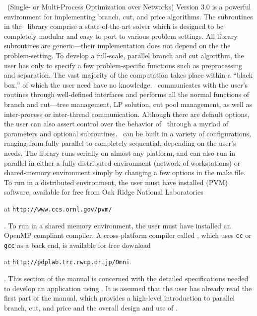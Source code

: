 \BB\ (Single- or Multi-Process Optimization over Networks) Version 3.0
is a powerful environment for implementing branch, cut, and price
algorithms. The subroutines in the \BB\ library comprise a
state-of-the-art solver which is designed to be completely modular and
easy to port to various problem settings. All library subroutines are
generic---their implementation does not depend on the the
problem-setting. To develop a full-scale, parallel branch and cut
algorithm, the user has only to specify a few problem-specific
functions such as preprocessing and separation. The vast majority of
the computation takes place within a ``black box,'' of which the user
need have no knowledge. \BB\ communicates with the user's routines
through well-defined interfaces and performs all the normal functions
of branch and cut---tree management, LP solution, cut pool management,
as well as inter-process or inter-thread communication. Although there
are default options, the user can also assert control over the
behavior of \BB\ through a myriad of parameters and optional
subroutines. \BB\ can be built in a variety of configurations, ranging
from fully parallel to completely sequential, depending on the user's
needs. The library runs serially on almost any platform, and can also
run in parallel in either a fully distributed environment (network of
workstations) or shared-memory environment simply by changing a few
options in the make file. To run in a distributed environment, the
user must have installed {\em {}} (PVM) software, available for
free from Oak Ridge National Laboratories
\begin{latexonly}
at {\tt http://www.ccs.ornl.gov/pvm/} 
\end{latexonly}. 
To run in a shared memory environment, the user must have installed an
OpenMP compliant compiler. A cross-platform compiler called {\em
{}}, which uses 
{\tt cc} or {\tt gcc} as a back end, is available for free download
\begin{latexonly}
at {\tt http://pdplab.trc.rwcp.or.jp/Omni}.
\end{latexonly}.
This section of the manual is concerned with the detailed
specifications needed to develop an application using \BB. It is
assumed that the user has already read the first part of the manual, which
provides a high-level introduction to parallel branch, cut, and price
and the overall design and use of \BB. 

